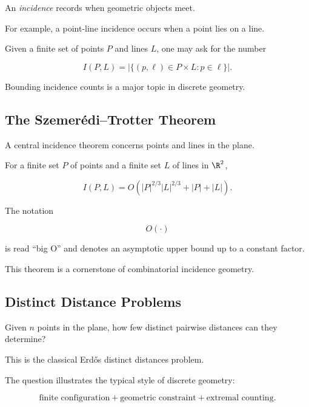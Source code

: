 An \emph{incidence} records when geometric objects meet.

For example, a point-line incidence occurs when a point lies on a line.

Given a finite set of points \(P\) and lines \(L\), one may ask for the
number

\[
\boxed{
I(P,L)
=
|\{(p,\ell)\in P\times L:p\in\ell\}|.
}
\]

Bounding incidence counts is a major topic in discrete geometry.

\subsection{The Szemer\'edi--Trotter Theorem}
\label{subsec:szemeredi-trotter}

A central incidence theorem concerns points and lines in the plane.

\begin{theorem}
For a finite set \(P\) of points and a finite set \(L\) of lines in
\(\R^2\),

\[
\boxed{
I(P,L)
=
O\left(
|P|^{2/3}|L|^{2/3}
+
|P|
+
|L|
\right).
}
\]
\end{theorem}

The notation

\[
O(\cdot)
\]

is read ``big O'' and denotes an asymptotic upper bound up to a constant
factor.

This theorem is a cornerstone of combinatorial incidence geometry.

\subsection{Distinct Distance Problems}
\label{subsec:distinct-distance-problems}

Given \(n\) points in the plane, how few distinct pairwise distances can
they determine?

This is the classical Erd\H{o}s distinct distances problem.

The question illustrates the typical style of discrete geometry:

\[
\boxed{
\text{finite configuration}
+
\text{geometric constraint}
+
\text{extremal counting}.
}
\]

